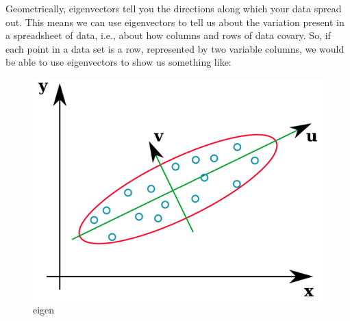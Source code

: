 \documentclass[11pt]{article}
\makeatletter
\def\maxwidth{\ifdim\Gin@nat@width>\linewidth\linewidth
    \else\Gin@nat@width\fi}
\let\Oldincludegraphics\includegraphics
\renewcommand{\includegraphics}[1]{\Oldincludegraphics[width=.8\maxwidth]{#1}}
\makeatother
\begin{document}
Geometrically, eigenvectors tell you the directions along which your
data spread out. This means we can use eigenvectors to tell us about the
variation present in a spreadsheet of data, i.e., about how columns and
rows of data covary. So, if each point in a data set is a row,
represented by two variable columns, we would be able to use
eigenvectors to show us something like:

\begin{figure}
\centering
\includegraphics{images/eigenvectors.png}
\caption{eigen}
\end{figure}


    
    
    
    
\end{document}
